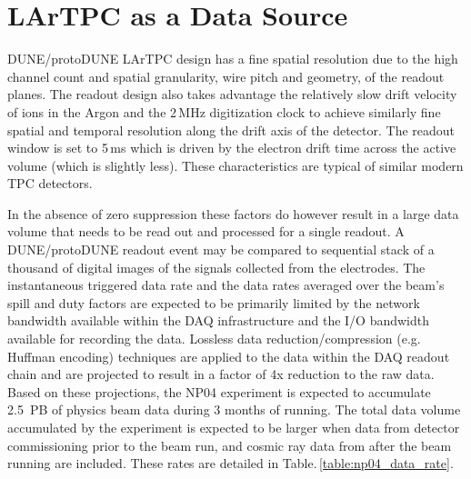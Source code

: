 \documentclass[pdftex,12pt,letter]{article}
\newcommand{\pd}{protoDUNE\xspace}
\begin{document}
\section{LArTPC as a Data Source}
\label{sec:np04_data_rate}
DUNE/\pd LArTPC design has a fine spatial resolution due to the high
channel count and spatial granularity, wire pitch and geometry, of the readout
planes.  The readout design also takes advantage the relatively slow
drift velocity of ions in the Argon and the 2\,MHz digitization clock
to achieve similarly fine spatial and temporal resolution along the
drift axis of the detector. The readout window is  set to 5\,ms 
which is driven by the electron drift time across
the active volume (which is slightly less).  These characteristics are typical of
similar modern TPC detectors.

In the absence of zero suppression these factors do however
result in a large data volume that needs to be read out and
processed for a single readout.
A DUNE/\pd readout event may be compared to sequential stack of a thousand of digital
images of the signals collected from the electrodes. 
The instantaneous triggered data rate and the data rates averaged over
the beam's spill and duty factors are expected to be primarily limited
by the network bandwidth available within the DAQ infrastructure and
the I/O bandwidth available for recording the data.  Lossless data
reduction/compression (e.g. Huffman encoding)
techniques are applied to the data within the DAQ readout chain and
are projected to result in a factor of 4x reduction to the raw data.
Based on these projections, the NP04 experiment is expected to accumulate 2.5~PB of physics beam
data during 3 months of running.  The total data volume accumulated by
the experiment is expected to be larger when data from
detector commissioning prior to the beam run, and cosmic ray data from
after the beam running are included.   These rates are detailed in Table.\,\ref{table:np04_data_rate}.
\end{document}

